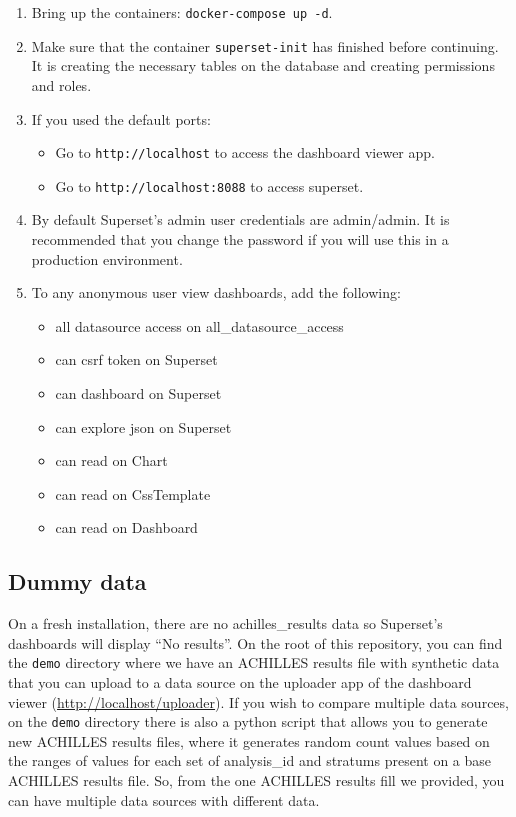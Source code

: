 \documentclass[
]{book}
\providecommand{\tightlist}{%
  \setlength{\itemsep}{0pt}\setlength{\parskip}{0pt}}
\begin{document}
\begin{enumerate}
\def\labelenumi{\arabic{enumi}.}
\item
  Bring up the containers: \texttt{docker-compose\ up\ -d}.
\item
  Make sure that the container \texttt{superset-init} has finished before continuing. It is creating the necessary tables on the database and creating permissions and roles.
\item
  If you used the default ports:

  \begin{itemize}
  \tightlist
  \item
    Go to \texttt{http://localhost} to access the dashboard viewer app.
  \item
    Go to \texttt{http://localhost:8088} to access superset.
  \end{itemize}
\item
  By default Superset's admin user credentials are admin/admin.
  It is recommended that you change the password if you will use this in a production environment.
\item
  To any anonymous user view dashboards, add the following:

  \begin{itemize}
  \tightlist
  \item
    all datasource access on all\_datasource\_access
  \item
    can csrf token on Superset
  \item
    can dashboard on Superset
  \item
    can explore json on Superset
  \item
    can read on Chart
  \item
    can read on CssTemplate
  \item
    can read on Dashboard
  \end{itemize}
\end{enumerate}

\hypertarget{dummy-data}{%
\subsection*{Dummy data}\label{dummy-data}}

On a fresh installation, there are no achilles\_results data so Superset's dashboards will display ``No results''. On the root of this repository, you can find the \texttt{demo} directory where we have an ACHILLES results file with synthetic data that you can upload to a data source on the uploader app of the dashboard viewer (\url{http://localhost/uploader}). If you wish to compare multiple data sources, on the \texttt{demo} directory there is also a python script that allows you to generate new ACHILLES results files, where it generates random count values based on the ranges of values for each set of analysis\_id and stratums present on a base ACHILLES results file. So, from the one ACHILLES results fill we provided, you can have multiple data sources with different data.
\end{document}
